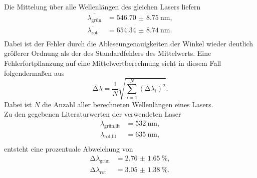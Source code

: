 Die Mittelung über alle Wellenlängen des gleichen Lasers liefern
\begin{align*}
\overline{\lambda_{\text{grün}}} &= \SI{546.70(875)}{\nano\meter},\\
\overline{\lambda_{\text{rot}}} &= \SI{654.34(874)}{\nano\meter}.\\
\end{align*}
Dabei ist der Fehler durch die Ableseungenauigkeiten der Winkel wieder deutlich größerer Ordnung als der des Standardfehlers des Mittelwerts. Eine Fehlerfortpflanzung auf eine Mittelwertberechnung
sieht in diesem Fall folgendermaßen aus
\begin{equation}
\increment \lambda = \frac{1}{N} \sqrt{\sum_{i=1}^{N} (\increment \lambda_{i})^2}.
\end{equation}
Dabei ist $N$ die Anzahl aller berechneten Wellenlängen eines Lasers.
\\
Zu den gegebenen Literaturwerten der verwendeten Laser 
\begin{align*}
    \lambda_{\text{grün,lit}} &= \SI{532}{\nano\meter}, \\
    \lambda_{\text{rot,lit}} &= \SI{635}{\nano\meter}, \\
\end{align*}
entsteht eine prozentuale Abweichung von 
\begin{align*}
    \increment \lambda_{\text{grün}} &= \SI{2.76(165)}{\percent}, \\
    \increment \lambda_{\text{rot}} &= \SI{3.05(138)}{\percent}.\\
\end{align*}

%

    
